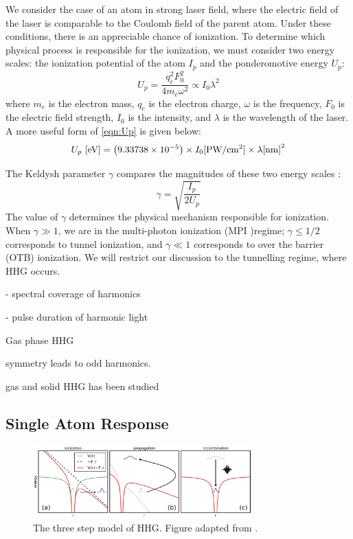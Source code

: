 We consider the case of an atom in strong laser field, where the electric field of the laser is comparable to the Coulomb field of the parent atom. Under these conditions, there is an appreciable chance of ionization. To determine which physical process is responsible for the ionization, we must consider two energy scales: the ionization potential of the atom $I_p$ and the ponderomotive energy $U_p$:
\begin{equation}
U_p = \frac{q_e^2 F_0^2}{4 m_e \omega^2} \propto I_0 \lambda^2
\label{eqn:Up}
\end{equation}
where $m_e$ is the electron mass, $q_e$ is the electron charge, $\omega$ is the frequency, $F_0$ is the electric field strength, $I_0$ is the intensity, and $\lambda$ is the wavelength of the laser. A more useful form of \cref{eqn:Up} is given below:
\begin{equation}
U_p \textrm{ [eV]} = \left( 9.33738 \times 10^{-5} \right) \times I_0 \textrm{[PW/cm\textsuperscript{2}]} \times \lambda\textrm{[nm]}^2
\end{equation}

The Keldysh parameter $\gamma$ compares the magnitudes of these two energy scales \cite{keldyshIonizationFieldStrong1965}:
\begin{equation}
\gamma = \sqrt{\frac{I_p}{2 U_p}}
\end{equation}
The value of $\gamma$ determines the physical mechanism responsible for ionization. When $\gamma \gg 1$, we are in the multi-photon ionization (MPI )regime; $\gamma \le 1/2$ corresponds to tunnel ionization, and $\gamma \ll 1$ corresponds to over the barrier (OTB) ionization. We will restrict our discussion to the tunnelling regime, where HHG occurs.

- spectral coverage of harmonics

- pulse duration of harmonic light

Gas phase HHG 

symmetry leads to odd harmonics.

gas and solid HHG has been studied

\subsection{Single Atom Response}

\begin{figure}
	\centering
	\includegraphics[width=0.75\textwidth]{figures/chap1/ThreeStepModel.png}
	\caption{The three step model of HHG. Figure adapted from \cite{schounAttosecondHighHarmonicSpectroscopy2015}.}
	\label{fig:ThreeStepModel}
\end{figure}

